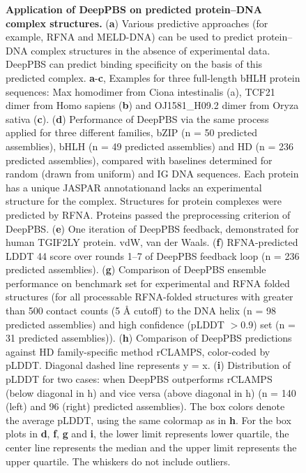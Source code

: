 \begin{center}
\addtocounter{figure}{-1}
\begin{figure} [t!]
  \caption[Application of DeepPBS on predicted protein–DNA complex structures.]{\textbf{Application of DeepPBS on predicted protein–DNA complex structures.} ({\bf a}) Various predictive approaches (for example, RFNA and MELD-DNA) can be used to predict protein–DNA complex structures in the absence of experimental data. DeepPBS can predict binding specificity on the basis of this predicted complex. {\bf a}-{\bf c}, Examples for three full-length bHLH protein sequences: Max homodimer from Ciona intestinalis (a), TCF21 dimer from Homo sapiens ({\bf b}) and OJ1581\_H09.2 dimer from Oryza sativa ({\bf c}). ({\bf d}) Performance of DeepPBS via the same process applied for three different families, bZIP (n = 50 predicted assemblies), bHLH (n = 49 predicted assemblies) and HD (n = 236 predicted assemblies), compared with baselines determined for random (drawn from uniform) and IG DNA sequences. Each protein has a unique JASPAR annotationand lacks an experimental structure for the complex. Structures for protein complexes were predicted by RFNA. Proteins passed the preprocessing criterion of DeepPBS. ({\bf e}) One iteration of DeepPBS feedback, demonstrated for human TGIF2LY protein. vdW, van der Waals. ({\bf f}) RFNA-predicted LDDT 44 score over rounds 1–7 of DeepPBS feedback loop (n = 236 predicted assemblies). ({\bf g}) Comparison of DeepPBS ensemble performance on benchmark set for experimental and RFNA folded structures (for all processable RFNA-folded structures with greater than 500 contact counts (5 Å cutoff) to the DNA helix (n = 98 predicted assemblies) and high confidence (pLDDT $>$0.9) set (n = 31 predicted assemblies)). ({\bf h}) Comparison of DeepPBS predictions against HD family-specific method rCLAMPS, color-coded by pLDDT. Diagonal dashed line represents y = x. ({\bf i}) Distribution of pLDDT for two cases: when DeepPBS outperforms rCLAMPS (below diagonal in h) and vice versa (above diagonal in h) (n = 140 (left) and 96 (right) predicted assemblies). The box colors denote the average pLDDT, using the same colormap as in {\bf h}. For the box plots in {\bf d}, {\bf f}, {\bf g} and {\bf i}, the lower limit represents lower quartile, the center line represents the median and the upper limit represents the upper quartile. The whiskers do not include outliers.}
\end{figure}
\end{center}

